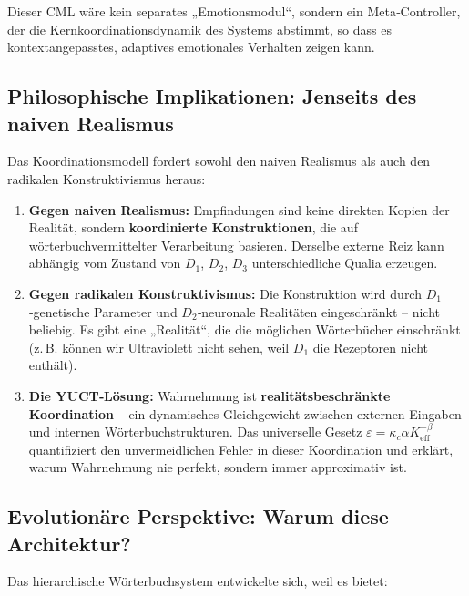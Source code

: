 \documentclass[12pt,a4paper]{article}
\newcommand{\eff}{\mathrm{eff}}
\newcommand{\Ke}{K_{\eff}}
\begin{document}
	Dieser CML wäre kein separates „Emotionsmodul“, sondern ein Meta‑Controller, der die Kernkoordinationsdynamik des Systems abstimmt, so dass es kontextangepasstes, adaptives emotionales Verhalten zeigen kann.
	
	\subsection{Philosophische Implikationen: Jenseits des naiven Realismus}
	
	Das Koordinationsmodell fordert sowohl den naiven Realismus als auch den radikalen Konstruktivismus heraus:
	
	\begin{enumerate}
		\item \textbf{Gegen naiven Realismus:} Empfindungen sind keine direkten Kopien der Realität, sondern \textbf{koordinierte Konstruktionen}, die auf wörterbuchvermittelter Verarbeitung basieren. Derselbe externe Reiz kann abhängig vom Zustand von $D_1$, $D_2$, $D_3$ unterschiedliche Qualia erzeugen.
		
		\item \textbf{Gegen radikalen Konstruktivismus:} Die Konstruktion wird durch $D_1$‑genetische Parameter und $D_2$‑neuronale Realitäten eingeschränkt – nicht beliebig. Es gibt eine „Realität“, die die möglichen Wörterbücher einschränkt (z. B. können wir Ultraviolett nicht sehen, weil $D_1$ die Rezeptoren nicht enthält).
		
		\item \textbf{Die YUCT‑Lösung:} Wahrnehmung ist \textbf{realitätsbeschränkte Koordination} – ein dynamisches Gleichgewicht zwischen externen Eingaben und internen Wörterbuchstrukturen. Das universelle Gesetz \(\varepsilon = \kappa_c \alpha \Ke^{-\beta}\) quantifiziert den unvermeidlichen Fehler in dieser Koordination und erklärt, warum Wahrnehmung nie perfekt, sondern immer approximativ ist.
	\end{enumerate}
	
	\subsection{Evolutionäre Perspektive: Warum diese Architektur?}
	
	Das hierarchische Wörterbuchsystem entwickelte sich, weil es bietet:
	
\end{document}
